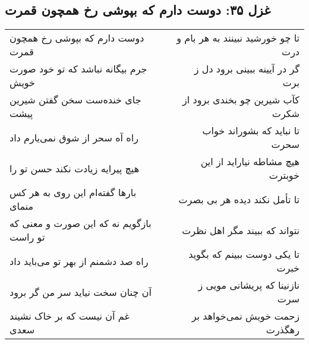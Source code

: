 \begin{center}
\section*{غزل ۳۵: دوست دارم که بپوشی رخ همچون قمرت}
\label{sec:035}
\begin{longtable}{l p{0.5cm} r}
دوست دارم که بپوشی رخ همچون قمرت
&&
تا چو خورشید نبینند به هر بام و درت
\\
جرم بیگانه نباشد که تو خود صورت خویش
&&
گر در آیینه ببینی برود دل ز برت
\\
جای خنده‌ست سخن گفتن شیرین پیشت
&&
کآب شیرین چو بخندی برود از شکرت
\\
راه آه سحر از شوق نمی‌یارم داد
&&
تا نباید که بشوراند خواب سحرت
\\
هیچ پیرایه زیادت نکند حسن تو را
&&
هیچ مشاطه نیاراید از این خوبترت
\\
بارها گفته‌ام این روی به هر کس منمای
&&
تا تأمل نکند دیده هر بی بصرت
\\
بازگویم نه که این صورت و معنی که تو راست
&&
نتواند که ببیند مگر اهل نظرت
\\
راه صد دشمنم از بهر تو می‌باید داد
&&
تا یکی دوست ببینم که بگوید خبرت
\\
آن چنان سخت نیاید سر من گر برود
&&
نازنینا که پریشانی مویی ز سرت
\\
غم آن نیست که بر خاک نشیند سعدی
&&
زحمت خویش نمی‌خواهد بر رهگذرت
\\
\end{longtable}
\end{center}
